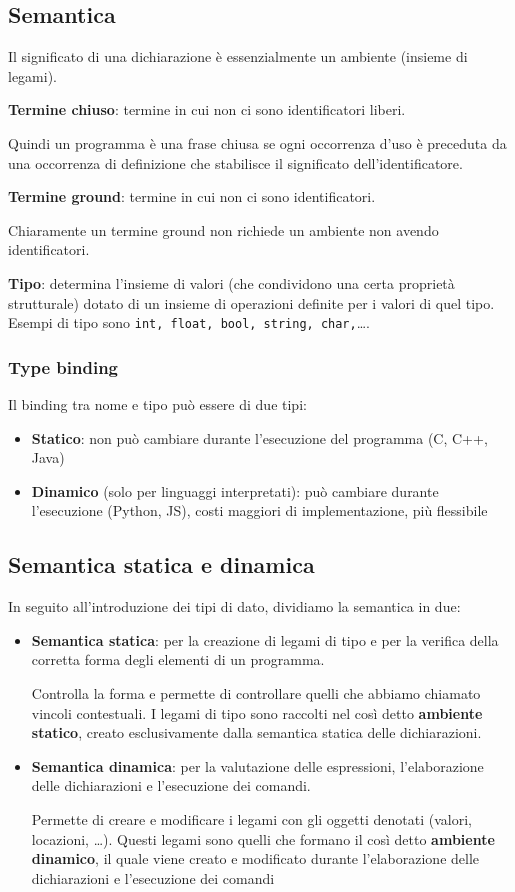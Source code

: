 \documentclass[12pt,a4paper]{article}
\begin{document}
\clearpage

\subsection{Semantica}
Il significato di una dichiarazione è essenzialmente un ambiente (insieme di legami).

\textbf{Termine chiuso}: termine in cui non ci sono identificatori liberi.

Quindi un programma è una frase chiusa se ogni occorrenza d'uso è preceduta da una occorrenza di definizione che stabilisce il significato dell'identificatore.

\textbf{Termine ground}: termine in cui non ci sono identificatori.

Chiaramente un termine ground non richiede un ambiente non avendo identificatori.

\textbf{Tipo}: determina l'insieme di valori (che condividono una certa proprietà strutturale) dotato di un insieme di operazioni definite per i valori di quel tipo. Esempi di tipo sono \texttt{int, float, bool, string, char,}\ldots.

\subsubsection{Type binding}
Il binding tra nome e tipo può essere di due tipi:
\begin{itemize}
\item \textbf{Statico}: non può cambiare durante l'esecuzione del programma (C, C++, Java)
\item \textbf{Dinamico} (solo per linguaggi interpretati): può cambiare durante l'esecuzione (Python, JS), costi maggiori di implementazione, più flessibile
\end{itemize}

\subsection{Semantica statica e dinamica}
In seguito all'introduzione dei tipi di dato, dividiamo la semantica in due:
\begin{itemize}
\item \textbf{Semantica statica}: per la creazione di legami di tipo e per la verifica della corretta forma degli elementi di un programma.

Controlla la forma e permette di controllare quelli che abbiamo chiamato vincoli contestuali. I legami di tipo sono raccolti nel così detto \textbf{ambiente statico}, creato esclusivamente dalla semantica statica delle dichiarazioni.
\item \textbf{Semantica dinamica}: per la valutazione delle espressioni, l'elaborazione delle dichiarazioni e l'esecuzione dei comandi.

Permette di creare e modificare i legami con gli oggetti denotati (valori, locazioni, \ldots). Questi legami sono quelli che formano il così detto \textbf{ambiente dinamico}, il quale viene creato e modificato durante l'elaborazione delle dichiarazioni e l'esecuzione dei comandi
\end{itemize}
\end{document}
